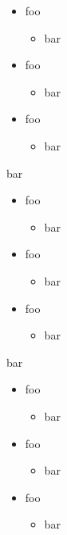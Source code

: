
\def\mytitle{Nested Lists}


\begin{itemize}
\item foo

\begin{itemize}
\item bar
\end{itemize}
\item foo

\begin{itemize}
\item bar
\end{itemize}
\item foo

\begin{itemize}
\item bar
\end{itemize}
\end{itemize}

bar

\begin{itemize}
\item foo

\begin{itemize}
\item bar
\end{itemize}
\item foo

\begin{itemize}
\item bar
\end{itemize}
\item foo

\begin{itemize}
\item bar
\end{itemize}
\end{itemize}

bar

\begin{itemize}
\item foo

\begin{itemize}
\item bar
\end{itemize}
\item foo

\begin{itemize}
\item bar
\end{itemize}
\item foo

\begin{itemize}
\item bar
\end{itemize}
\end{itemize}

